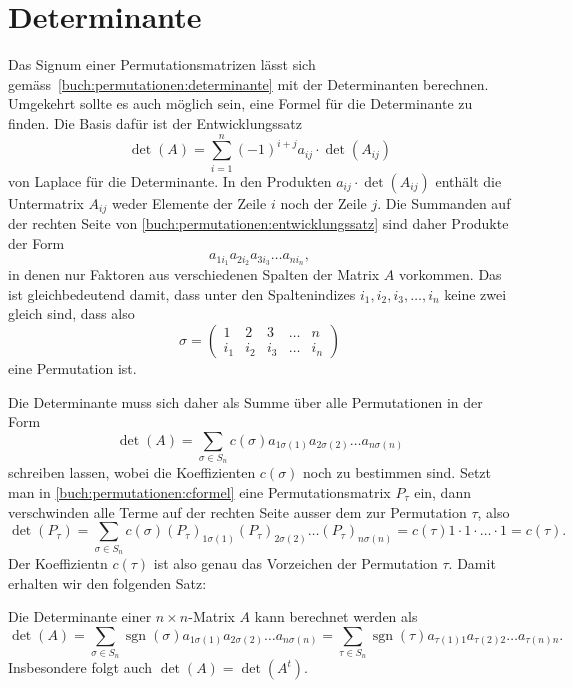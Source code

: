 %
%
%
\section{Determinante
\label{buch:section:determinante}}
Das Signum einer Permutationsmatrizen lässt sich
gemäss~\eqref{buch:permutationen:determinante}
mit der Determinanten berechnen.
Umgekehrt sollte es auch möglich sein, eine Formel
für die Determinante zu finden.
Die Basis dafür ist der
Entwicklungssatz 
\begin{equation}
\det(A)
=
\sum_{i=1}^n (-1)^{i+j} a_{ij} \cdot \det(A_{ij})
\label{buch:permutationen:entwicklungssatz}
\end{equation}
von Laplace für die Determinante.
In den Produkten $a_{ij}\cdot\det(A_{ij})$ enthält 
die Untermatrix $A_{ij}$ weder Elemente der Zeile $i$ noch der 
Zeile $j$.
Die Summanden auf der rechten Seite von
\eqref{buch:permutationen:entwicklungssatz}
sind daher Produkte der Form
\[
a_{1i_1}
a_{2i_2}
a_{3i_3}
\dots
a_{ni_n},
\]
in denen nur Faktoren aus verschiedenen Spalten der Matrix $A$
vorkommen.
Das ist gleichbedeutend damit, dass unter den Spaltenindizes
$i_1,i_2,i_3,\dots,i_n$ keine zwei gleich sind, dass also
\[
\sigma
=
\begin{pmatrix}
1&2&3&\dots&n\\
i_1&i_2&i_3&\dots&i_n
\end{pmatrix}
\]
eine Permutation ist.

Die Determinante muss sich daher als Summe über alle Permutationen
in der Form
\begin{equation}
\det(A)
=
\sum_{\sigma\in S_n} 
c(\sigma)
a_{1\sigma(1)}
a_{2\sigma(2)}
\dots
a_{n\sigma(n)}
\label{buch:permutationen:cformel}
\end{equation}
schreiben lassen, wobei die Koeffizienten $c(\sigma)$ noch zu bestimmen
sind.
Setzt man in
\eqref{buch:permutationen:cformel}
eine Permutationsmatrix $P_\tau$ ein, dann verschwinden alle
Terme auf der rechten Seite ausser dem zur Permutation $\tau$,
also
\[
\det(P_\tau)
=
\sum_{\sigma \in S_n}
c(\sigma)
(P_\tau)_{1\sigma(1)}
(P_\tau)_{2\sigma(2)}
\dots
(P_\tau)_{n\sigma(n)}
=
c(\tau)
1\cdot 1\cdot\dots\cdot 1
=
c(\tau).
\]
Der Koeffizientn $c(\tau)$ ist also genau das Vorzeichen
der Permutation $\tau$.
Damit erhalten wir den folgenden Satz:

\begin{satz}
Die Determinante einer $n\times n$-Matrix $A$ kann berechnet werden als
\[
\det(A)
=
\sum_{\sigma\in S_n}
\operatorname{sgn}(\sigma)
a_{1\sigma(1)}
a_{2\sigma(2)}
\dots
a_{n\sigma(n)}
=
\sum_{\tau\in S_n}
\operatorname{sgn}(\tau)
a_{\tau(1)1}
a_{\tau(2)2}
\dots
a_{\tau(n)n}.
\]
Insbesondere folgt auch $\det(A)=\det(A^t)$.
\end{satz}

